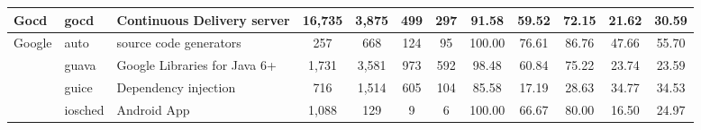 \begin{landscape}
\begin{table}
\begin{tabular}{lllccccccccc}
Gocd                        & gocd                                                          & Continuous Delivery server                                               & 16,735          & 3,875            & 499                                                              & 297            & 91.58          & 59.52          & 72.15          & 21.62                                                             & 30.59                                                              \\ \hline
\multirow{4}{*}{Google}     & auto                                                          & source code generators                                                   & 257             & 668              & 124                                                              & 95             & 100.00         & 76.61          & 86.76          & 47.66                                                             & 55.70                                                              \\
                            & guava                                                         & Google Libraries for Java 6+                                             & 1,731           & 3,581            & 973                                                              & 592            & 98.48          & 60.84          & 75.22          & 23.74                                                             & 23.59                                                              \\
                            & guice                                                         & Dependency injection                                                     & 716             & 1,514            & 605                                                              & 104            & 85.58          & 17.19          & 28.63          & 34.77                                                             & 34.53                                                              \\
                            & iosched                                                       & Android App                                                              & 1,088           & 129              & 9                                                                & 6              & 100.00         & 66.67          & 80.00          & 16.50                                                             & 24.97                                                              \\ \hline

\end{tabular}
\end{table}
\end{landscape}
